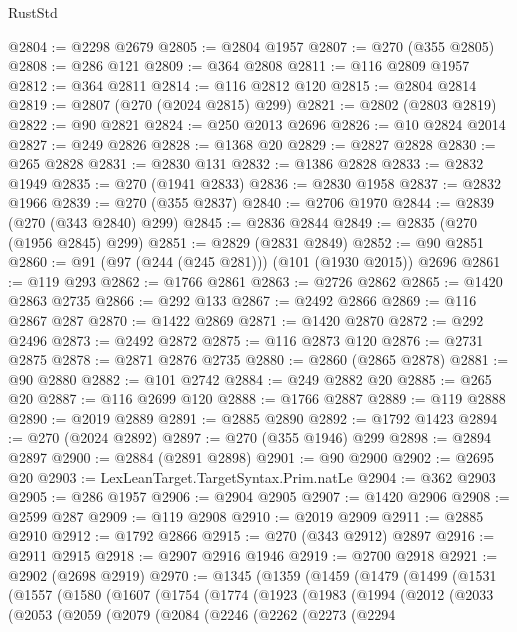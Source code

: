 \begin{lexlean}{RustStd}
\begin{coremodule}
@2804 := @2298 @2679
@2805 := @2804 @1957
@2807 := @270 (@355 @2805)
@2808 := @286 @121
@2809 := @364 @2808
@2811 := @116 @2809 @1957
@2812 := @364 @2811
@2814 := @116 @2812 @120
@2815 := @2804 @2814
@2819 := @2807 (@270 (@2024 @2815) @299)
@2821 := @2802 (@2803 @2819)
@2822 := @90 @2821
@2824 := @250 @2013 @2696
@2826 := @10 @2824 @2014
@2827 := @249 @2826
@2828 := @1368 @20
@2829 := @2827 @2828
@2830 := @265 @2828
@2831 := @2830 @131
@2832 := @1386 @2828
@2833 := @2832 @1949
@2835 := @270 (@1941 @2833)
@2836 := @2830 @1958
@2837 := @2832 @1966
@2839 := @270 (@355 @2837)
@2840 := @2706 @1970
@2844 := @2839 (@270 (@343 @2840) @299)
@2845 := @2836 @2844
@2849 := @2835 (@270 (@1956 @2845) @299)
@2851 := @2829 (@2831 @2849)
@2852 := @90 @2851
@2860 := @91 (@97 (@244 (@245 @281))) (@101 (@1930 @2015)) @2696
@2861 := @119 @293
@2862 := @1766 @2861
@2863 := @2726 @2862
@2865 := @1420 @2863 @2735
@2866 := @292 @133
@2867 := @2492 @2866
@2869 := @116 @2867 @287
@2870 := @1422 @2869
@2871 := @1420 @2870
@2872 := @292 @2496
@2873 := @2492 @2872
@2875 := @116 @2873 @120
@2876 := @2731 @2875
@2878 := @2871 @2876 @2735
@2880 := @2860 (@2865 @2878)
@2881 := @90 @2880
@2882 := @101 @2742
@2884 := @249 @2882 @20
@2885 := @265 @20
@2887 := @116 @2699 @120
@2888 := @1766 @2887
@2889 := @119 @2888
@2890 := @2019 @2889
@2891 := @2885 @2890
@2892 := @1792 @1423
@2894 := @270 (@2024 @2892)
@2897 := @270 (@355 @1946) @299
@2898 := @2894 @2897
@2900 := @2884 (@2891 @2898)
@2901 := @90 @2900
@2902 := @2695 @20
@2903 := LexLeanTarget.TargetSyntax.Prim.natLe
@2904 := @362 @2903
@2905 := @286 @1957
@2906 := @2904 @2905
@2907 := @1420 @2906
@2908 := @2599 @287
@2909 := @119 @2908
@2910 := @2019 @2909
@2911 := @2885 @2910
@2912 := @1792 @2866
@2915 := @270 (@343 @2912) @2897
@2916 := @2911 @2915
@2918 := @2907 @2916 @1946
@2919 := @2700 @2918
@2921 := @2902 (@2698 @2919)
@2970 := @1345
    (@1359
      (@1459
        (@1479
          (@1499
            (@1531
              (@1557
                (@1580
                  (@1607
                    (@1754
                      (@1774
                        (@1923
                          (@1983
                            (@1994
                              (@2012
                                (@2033
                                  (@2053
                                    (@2059
                                      (@2079
                                        (@2084
                                          (@2246
                                            (@2262
                                              (@2273
                                                (@2294

\end{coremodule}
\end{lexlean}

